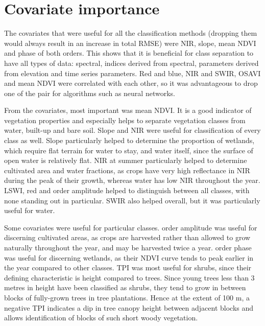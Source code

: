 \documentclass[a4paper,10pt]{book}
\begin{document}
\section{Covariate importance}

The covariates that were useful for all the classification methods (dropping them would always result in an increase in total RMSE) were NIR, slope, mean NDVI and phase of both orders. This shows that it is beneficial for class separation to have all types of data: spectral, indices derived from spectral, parameters derived from elevation and time series parameters. Red and blue, NIR and SWIR, OSAVI and mean NDVI were correlated with each other, so it was advantageous to drop one of the pair for algorithms such as neural networks.

From the covariates, most important was mean NDVI. It is a good indicator of vegetation properties and especially helps to separate vegetation classes from water, built-up and bare soil. Slope and NIR were useful for classification of every class as well. Slope particularly helped to determine the proportion of wetlands, which require flat terrain for water to stay, and water itself, since the surface of open water is relatively flat. NIR at summer particularly helped to determine cultivated area and water fractions, as crops have very high reflectance in NIR during the peak of their growth, whereas water has low NIR throughout the year. LSWI, red and  order amplitude helped to distinguish between all classes, with none standing out in particular. SWIR also helped overall, but it was particularly useful for water.

Some covariates were useful for particular classes.  order amplitude was useful for discerning cultivated areas, as crops are harvested rather than allowed to grow naturally throughout the year, and may be harvested twice a year.  order phase was useful for discerning wetlands, as their NDVI curve tends to peak earlier in the year compared to other classes. TPI was most useful for shrubs, since their defining characteristic is height compared to trees. Since young trees less than 3 metres in height have been classified as shrubs, they tend to grow in between blocks of fully-grown trees in tree plantations. Hence at the extent of 100 m, a negative TPI indicates a dip in tree canopy height between adjacent blocks and allows identification of blocks of such short woody vegetation.
\end{document}
